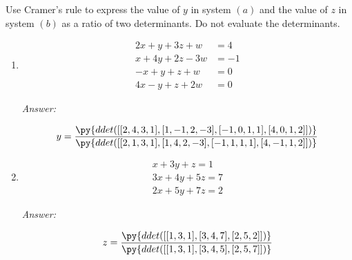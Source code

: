 \documentclass[letterpaper]{article}
\newcommand{\ans}{\textit{Answer: }}
\newenvironment{question}[2][Question]{\begin{trivlist}
\item[\hskip \labelsep {\bfseries #1}\hskip \labelsep {\bfseries #2.}]}{\end{trivlist}}
\begin{document}
\begin{question}{4.35}
  Use Cramer's rule to express the value of \(y\) in system \((a)\) and the value of \(z\) in
  system \((b)\) as a ratio of two determinants. Do not evaluate the determinants.

  \begin{enumerate}[label=\textbf{(\alph*)}]
    \item 
    $$
    \begin{aligned} 2 x+y+3 z+w &=4 \\ x+4 y+2 z-3 w &=-1 \\-x+y+z+w &=0 \\ 4 x-y+z+2 w &=0 \end{aligned}
    $$

    \ans 

    $$
    y = \frac{
      \py{ddet([
      [2, 4, 3, 1],
      [1, -1, 2, -3],
      [-1, 0, 1, 1],
      [4, 0, 1, 2]
      ])}
    }{
      \py{ddet([
      [2, 1, 3, 1],
      [1, 4, 2, -3],
      [-1, 1, 1, 1],
      [4, -1, 1, 2]
      ])}
    }
    $$

    \item
    $$
    \begin{array}{c}{x+3 y+z=1} \\ {3 x+4 y+5 z=7} \\ {2 x+5 y+7 z=2}\end{array}
    $$

    \ans 

    $$
    z = \frac{
      \py{ddet([
        [1, 3, 1],
        [3, 4, 7],
        [2, 5, 2]
      ])}
    }{
      \py{ddet([
        [1, 3, 1],
        [3, 4, 5],
        [2, 5, 7]
      ])}
    }
    $$
  \end{enumerate}
  
\end{question}
\end{document}
